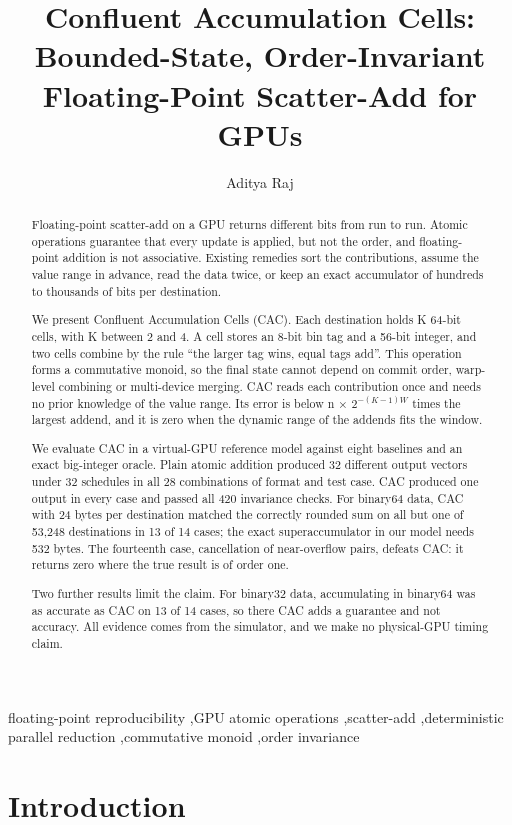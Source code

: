 \documentclass[3p,10pt]{elsarticle}
\begin{document}
\begin{frontmatter}
\title{Confluent Accumulation Cells: Bounded-State, Order-Invariant Floating-Point Scatter-Add for GPUs}
\author{Aditya Raj}
\address{School of Artificial Intelligence and Data Science, Indian Institute of Technology Jodhpur, Jodhpur, India}
\begin{abstract}
Floating-point scatter-add on a GPU returns different bits from run to
run. Atomic operations guarantee that every update is applied, but not
the order, and floating-point addition is not associative. Existing
remedies sort the contributions, assume the value range in advance, read
the data twice, or keep an exact accumulator of hundreds to thousands of
bits per destination.

We present Confluent Accumulation Cells (CAC). Each destination holds K
64-bit cells, with K between 2 and 4. A cell stores an 8-bit bin tag and
a 56-bit integer, and two cells combine by the rule ``the larger tag
wins, equal tags add''. This operation forms a commutative monoid, so
the final state cannot depend on commit order, warp-level combining or
multi-device merging. CAC reads each contribution once and needs no
prior knowledge of the value range. Its error is below n ×
\(2^{-(K-1)W}\) times the largest addend, and it is zero when the
dynamic range of the addends fits the window.

We evaluate CAC in a virtual-GPU reference model against eight baselines
and an exact big-integer oracle. Plain atomic addition produced 32
different output vectors under 32 schedules in all 28 combinations of
format and test case. CAC produced one output in every case and passed
all 420 invariance checks. For binary64 data, CAC with 24 bytes per
destination matched the correctly rounded sum on all but one of 53,248
destinations in 13 of 14 cases; the exact superaccumulator in our model
needs 532 bytes. The fourteenth case, cancellation of near-overflow
pairs, defeats CAC: it returns zero where the true result is of order
one.

Two further results limit the claim. For binary32 data, accumulating in
binary64 was as accurate as CAC on 13 of 14 cases, so there CAC adds a
guarantee and not accuracy. All evidence comes from the simulator, and
we make no physical-GPU timing claim.
\end{abstract}
\begin{keyword}
floating-point reproducibility \sep GPU atomic operations \sep scatter-add \sep deterministic parallel reduction \sep commutative monoid \sep order invariance
\end{keyword}
\end{frontmatter}
\hypertarget{introduction}{%
\section{Introduction}\label{introduction}}
\end{document}
